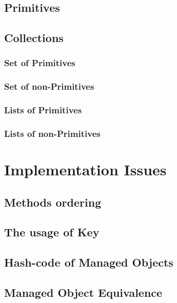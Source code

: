 \subsection{Primitives}\label{subsec:Types Primitives}

\subsection{Collections}\label{subsec:Types Collections}

\subsubsection{Set of Primitives}
\subsubsection{Set of non-Primitives}
\subsubsection{Lists of Primitives}
\subsubsection{Lists of non-Primitives}

\section{Implementation Issues}\label{sec:Implementation Issues}

\subsection{Methods ordering}\label{subsec:Methods ordering}


\subsection{The usage of Key}\label{subsec:The usage of Key}

\subsection{Hash-code of Managed Objects}\label{subsec:Hashcode of Managed Objects}


\subsection{Managed Object Equivalence}\label{subsec:Managed Object equivalence}
